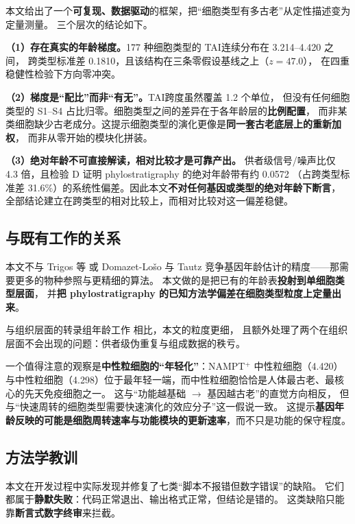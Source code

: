 \documentclass{cjc}
\newcommand{\tai}{\textrm{TAI}}
\begin{document}
本文给出了一个\textbf{可复现、数据驱动}的框架，把“细胞类型有多古老”从定性描述变为定量测量。
三个层次的结论如下。

\textbf{（1）存在真实的年龄梯度。}177 种细胞类型的 \tai 连续分布在 3.214--4.420 之间，
跨类型标准差 0.1810，且该结构在三条零假设基线之上（$z = 47.0$），
在四重稳健性检验下方向零冲突。

\textbf{（2）梯度是“配比”而非“有无”。}\tai 跨度虽然覆盖 1.2 个单位，
但没有任何细胞类型的 S1--S4 占比归零。细胞类型之间的差异在于各年龄层的\textbf{比例配置}，
而非某类细胞缺少古老成分。这提示细胞类型的演化更像是\textbf{同一套古老底层上的重新加权}，
而非从零开始的模块化拼装。

\textbf{（3）绝对年龄不可直接解读，相对比较才是可靠产出。}
供者级信号/噪声比仅 4.3 倍，且检验 D 证明 phylostratigraphy 的绝对年龄带有约 0.0572
（占跨类型标准差 31.6\%）的系统性偏差。因此本文\textbf{不对任何基因或类型的绝对年龄下断言}，
全部结论建立在跨类型的相对比较上，而相对比较对这一偏差稳健。

\subsection{与既有工作的关系}

本文不与 Trigos 等\cite{trigos2017} 或 Domazet-Lošo 与 Tautz\cite{domazetloso2010}
竞争基因年龄估计的精度——那需要更多的物种参照与更精细的算法。
本文做的是把已有的年龄表\textbf{投射到单细胞类型层面}，
并\textbf{把 phylostratigraphy 的已知方法学偏差在细胞类型粒度上定量出来}。

与组织层面的转录组年龄工作\cite{ren2020} 相比，本文的粒度更细，
且额外处理了两个在组织层面不会出现的问题：供者级伪重复与组成数据的秩亏。

一个值得注意的观察是\textbf{中性粒细胞的“年轻化”}：NAMPT$^{+}$ 中性粒细胞（4.420）
与中性粒细胞（4.298）位于最年轻一端，而中性粒细胞恰恰是人体最古老、最核心的先天免疫细胞之一。
这与“功能越基础 $\to$ 基因越古老”的直觉方向相反，
但与“快速周转的细胞类型需要快速演化的效应分子”这一假说一致。
这提示\textbf{基因年龄反映的可能是细胞周转速率与功能模块的更新速率}，而不只是功能的保守程度。

\subsection{方法学教训}

本文在开发过程中实际发现并修复了七类“脚本不报错但数字错误”的缺陷。
它们都属于\textbf{静默失败}：代码正常退出、输出格式正常，但结论是错的。
这类缺陷只能靠\textbf{断言式数字终审}来拦截。
\end{document}
